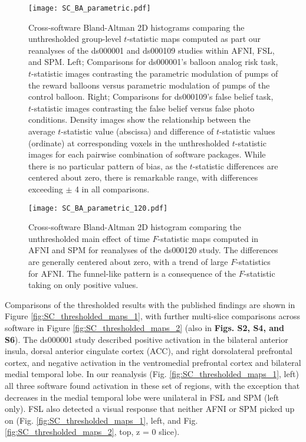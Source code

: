 \begin{figure}[htbp]
\centering
	\texttt{[image: SC\_BA\_parametric.pdf]}	
\caption{Cross-software Bland-Altman 2D histograms comparing the unthresholded group-level $t$-statistic maps computed as part our reanalyses of the ds000001 and ds000109 studies within AFNI, FSL, and SPM. Left; Comparisons for ds000001's balloon analog risk task, $t$-statistic images contrasting the parametric modulation of pumps of the reward balloons versus parametric modulation of pumps of the control balloon. Right; Comparisons for ds000109's false belief task, $t$-statistic images contrasting the false belief versus false photo conditions. Density images show the relationship between the average $t$-statistic value (abscissa) and difference of $t$-statistic values (ordinate) at corresponding voxels in the unthresholded $t$-statistic images for each pairwise combination of software packages. While there is no particular pattern of bias, as the $t$-statistic differences are centered about zero, there is remarkable range, with differences exceeding $\pm$ 4 in all comparisons.}
\label{fig:BA_parametric}
\end{figure}

\begin{figure}[htbp]
\centering
	\texttt{[image: SC\_BA\_parametric\_120.pdf]}	
\caption{Cross-software Bland-Altman 2D histogram comparing the unthresholded main effect of time $F$-statistic maps computed in AFNI and SPM for reanalyses of the ds000120 study. The differences are generally centered about zero, with a trend of large $F$-statistics for AFNI. The funnel-like pattern is a consequence of the $F$-statistic taking on only positive values.}
\label{fig:BA_parametric_120}
\end{figure}

Comparisons of the thresholded results with the published findings are shown in Figure \ref{fig:SC_thresholded_maps_1}, with further multi-slice comparisons across software in Figure \ref{fig:SC_thresholded_maps_2} (also in \textbf{Figs. S2, S4, and S6}). The ds000001 study described positive activation in the bilateral anterior insula, dorsal anterior cingulate cortex (ACC), and right dorsolateral prefrontal cortex, and negative activation in the ventromedial prefrontal cortex and bilateral medial temporal lobe. In our reanalysis (Fig.  \ref{fig:SC_thresholded_maps_1}, left) all three software found activation in these set of regions, with the exception that decreases in the medial temporal lobe were unilateral in FSL and SPM (left only). FSL also detected a visual response that neither AFNI or SPM picked up on (Fig.  \ref{fig:SC_thresholded_maps_1},  left, and Fig.  \ref{fig:SC_thresholded_maps_2}, top, z = 0 slice).

